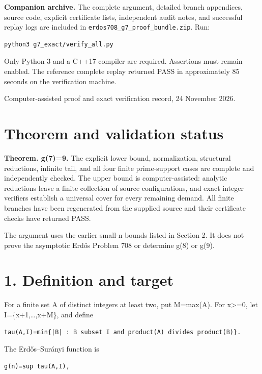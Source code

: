 \documentclass[11pt,a4paper]{article}
\begin{document}
\textbf{Companion archive.} The complete argument, detailed branch
appendices, source code, explicit certificate lists, independent audit
notes, and successful replay logs are included in
\nolinkurl{erdos708_g7_proof_bundle.zip}. Run:
\begin{verbatim}
python3 g7_exact/verify_all.py
\end{verbatim}
Only Python 3 and a C++17 compiler are required. Assertions must remain
enabled. The reference complete replay returned PASS in approximately
85 seconds on the verification machine.
\newpage
\tableofcontents
\newpage

Computer-assisted proof and exact verification record, 24 November 2026.

\section{Theorem and validation
status}\label{theorem-and-validation-status}

\textbf{Theorem. g(7)=9.} The explicit lower bound, normalization,
structural reductions, infinite tail, and all four finite prime-support
cases are complete and independently checked. The upper bound is
computer-assisted: analytic reductions leave a finite collection of
source configurations, and exact integer verifiers establish a universal
cover for every remaining demand. All finite branches have been
regenerated from the supplied source and their certificate checks have
returned PASS.

The argument uses the earlier small-n bounds listed in Section 2. It
does not prove the asymptotic Erdős Problem 708 or determine g(8) or
g(9).

\section{1. Definition and target}\label{definition-and-target}

For a finite set A of distinct integers at least two, put M=max(A). For
x\textgreater=0, let I=\{x+1,\ldots,x+M\}, and define

\begin{verbatim}
tau(A,I)=min{|B| : B subset I and product(A) divides product(B)}.
\end{verbatim}

The Erdős--Surányi function is

\begin{verbatim}
g(n)=sup tau(A,I),
\end{verbatim}
\end{document}
